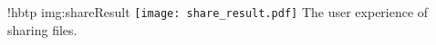 \namedfigure
{!hbtp}
{img:shareResult}
{\texttt{[image: share\_result.pdf]}}
{The user experience of sharing files.}
